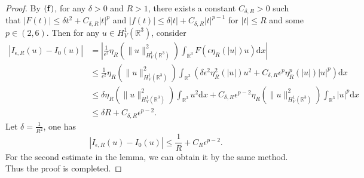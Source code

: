 \documentclass[12pt]{amsart}
\numberwithin{equation}{section}
\theoremstyle{definition}
\begin{document}
\begin{proof}
   By ${\bf (f)}$, for any $ \delta >0$ and $R>1$, there exists a constant $C_{\delta,R}>0$ such that $|F\left (t \right )|\leq \delta  t^{2}+C_{\delta,R}\left | t\right |^{p}$ and $\left | f\left ( t \right )\right |\leq \delta \left | t\right |+C_{\delta ,R}\left | t\right |^{p-1}$ for $\left | t\right |\leq R$ and some $p\in(2,6)$. Then for any $u\in  H_{V}^{1}\left ( \mathbb{R}^{3} \right )$, consider
    \begin{equation*}
        \begin{aligned}
            \left | I_{\epsilon,R }\left ( u \right )-I_{0}\left ( u \right )\right |&=\left |\frac{1}{\epsilon ^{2}} \eta _{R}\left ( \|u\|^{2}_{H^1_{V}(\mathbb{R}^3)}\right ) \int_{\mathbb{R}^{3}}F\left (\epsilon\eta _{R} \left ( \left | u\right | \right )u\right )\text{d}x\right |\\
            &\leq \frac{1}{\epsilon^{2}} \eta _{R}\left (\|u\|^{2}_{H^1_{V}(\mathbb{R}^3)} \right )
            \int_{\mathbb{R}^{3}}\left ( \delta \epsilon ^{2} \eta _{R}^{2}\left ( \left | u\right | \right )u^{2}+C_{\delta,R}\epsilon^{p}\eta _{R}^{p}\left ( \left | u\right | \right )\left | u\right |^{p}\right )\text{d}x\\
            & \leq\delta \eta _{R}\left ( \|u\|^{2}_{H^1_{V}(\mathbb{R}^3)}\right )\int_{\mathbb{R}^{3}}u^{2}\text{d}x +C_{\delta,R}\epsilon^{p-2}\eta _{R}\left ( \|u\|^{2}_{H^1_{V}(\mathbb{R}^3)}\right )\int_{\mathbb{R}^{3}}\left | u\right |^{p}\text{d}x \\
            &\leq \delta R+C_{\delta,R}\epsilon^{p-2}.
        \end{aligned}
    \end{equation*}
    Let $\delta = \frac{1}{R^{2}}$, one has
    \begin{equation*}
         \left | I_{\epsilon ,R }\left ( u \right )-I_{0}\left ( u \right )\right |\leq \frac{1}{R}+C_{R}\epsilon ^{p-2}.
    \end{equation*}
For the second estimate in the lemma, we can obtain it by the same method. Thus the proof is completed.
\end{proof}
\end{document}
